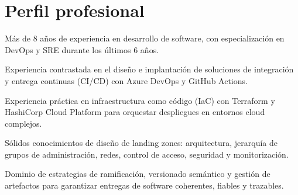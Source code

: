 \documentclass[11pt]{deedy-resume-openfont}
\begin{document}

\vspace{0.5cm}
\section{Perfil profesional}
\vspace{0.2cm}
\begin{tightemize}
\item Más de 8 años de experiencia en desarrollo de software, con especialización en DevOps y SRE durante los últimos 6 años.
\item Experiencia contrastada en el diseño e implantación de soluciones de integración y entrega continuas (CI/CD) con Azure DevOps y GitHub Actions.
\item Experiencia práctica en infraestructura como código (IaC) con Terraform y HashiCorp Cloud Platform para orquestar despliegues en entornos cloud complejos.
\item Sólidos conocimientos de diseño de landing zones: arquitectura, jerarquía de grupos de administración, redes, control de acceso, seguridad y monitorización.
\item Dominio de estrategias de ramificación, versionado semántico y gestión de artefactos para garantizar entregas de software coherentes, fiables y trazables.
\end{tightemize}

\vspace{0.5cm}
\end{document}
